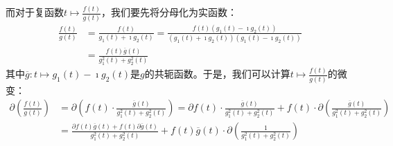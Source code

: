 \documentclass[12pt,UTF8]{ctexbook}
\theoremstyle{definition}
\theoremstyle{plain}
\begin{document}
而对于复函数$t\mapsto \frac{f(t)}{g(t)}$，我们要先将分母化为实函数：
\begin{align*}
    \frac{f(t)}{g(t)} &= \frac{f(t)}{g_1(t) + \imath g_2 (t)} = \frac{f(t)(g_1(t) - \imath g_2 (t))}{(g_1(t) + \imath g_2 (t))(g_1(t) - \imath g_2 (t))} \\
    &= \frac{f(t)\overline{g}(t)}{g_1^2(t) + g_2^2 (t)}
\end{align*}
其中$\overline{g}: t\mapsto g_1(t) - \imath g_2 (t)$是$g$的共轭函数。于是，我们可以计算$t\mapsto \frac{f(t)}{g(t)}$的微变：
\begin{align*}
    \partial \left(\frac{f(t)}{g(t)}\right) &= \partial \left(f(t) \cdot \frac{\overline{g}(t)}{g_1^2(t) + g_2^2 (t)}\right) = \partial f(t) \cdot \frac{\overline{g}(t)}{g_1^2(t) + g_2^2 (t)} + f(t) \cdot \partial \left(\frac{\overline{g}(t)}{g_1^2(t) + g_2^2 (t)}\right) \\
    &= \frac{\partial f(t)\overline{g}(t) + f(t) \partial \overline{g}(t)}{g_1^2(t) + g_2^2 (t)} + f(t) \overline{g}(t) \cdot \partial \left(\frac{1}{g_1^2(t) + g_2^2 (t)}\right) \\
%

\end{align*}
\end{document}

